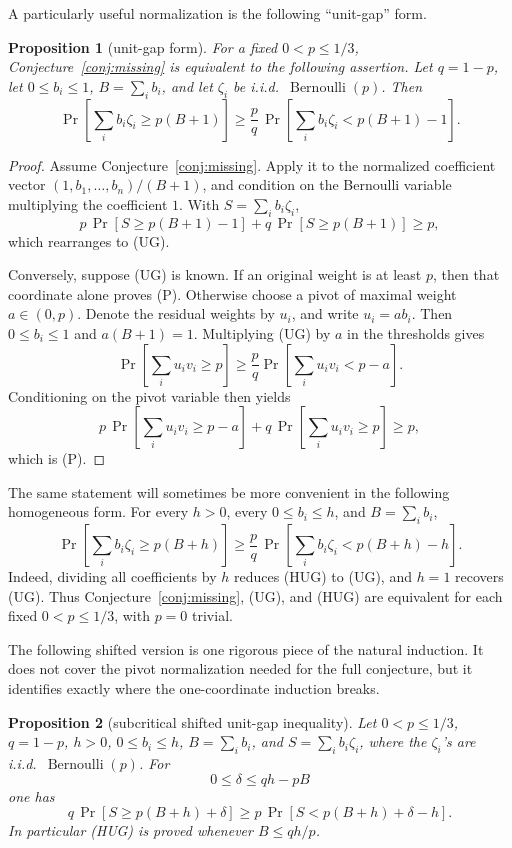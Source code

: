 \documentclass[12pt]{article}
\newtheorem{proposition}{Proposition}
\newcommand{\Ber}{\operatorname{Bernoulli}}
\begin{document}
A particularly useful normalization is the following ``unit-gap'' form.

\begin{proposition}[unit-gap form]\label{prop:unitgap}
For a fixed \(0<p\le1/3\), Conjecture~\ref{conj:missing} is equivalent to the
following assertion.  Let \(q=1-p\), let \(0\le b_i\le1\),
\(B=\sum_i b_i\), and let \(\zeta_i\) be i.i.d.\ \(\Ber(p)\).  Then
\[
 \Pr\!\left[\sum_i b_i\zeta_i\ge p(B+1)\right]
 \ge
 \frac{p}{q}\,
 \Pr\!\left[\sum_i b_i\zeta_i<p(B+1)-1\right].            \tag{UG}
\]
\end{proposition}

\begin{proof}
Assume Conjecture~\ref{conj:missing}.  Apply it to the normalized coefficient vector
\((1,b_1,\ldots,b_n)/(B+1)\), and condition on the
Bernoulli variable multiplying the coefficient \(1\).  With
\(S=\sum_i b_i\zeta_i\),
\[
 p\,\Pr[S\ge p(B+1)-1]+q\,\Pr[S\ge p(B+1)]\ge p,
\]
which rearranges to (UG).

Conversely, suppose (UG) is known.  If an original weight is at least \(p\),
then that coordinate alone proves (P).  Otherwise choose a pivot of maximal
weight \(a\in(0,p)\).  Denote the residual weights by \(u_i\), and write
\(u_i=a b_i\).  Then \(0\le b_i\le1\) and \(a(B+1)=1\).  Multiplying (UG) by \(a\) in the thresholds
gives
\[
 \Pr\!\left[\sum_i u_i v_i\ge p\right]
 \ge \frac pq
 \Pr\!\left[\sum_i u_i v_i<p-a\right].
\]
Conditioning on the pivot variable then yields
\[
 p\,\Pr\!\left[\sum_i u_i v_i\ge p-a\right]
 +q\,\Pr\!\left[\sum_i u_i v_i\ge p\right]\ge p,
\]
which is (P).
\end{proof}

The same statement will sometimes be more convenient in the following
homogeneous form.  For every \(h>0\), every \(0\le b_i\le h\), and
\(B=\sum_i b_i\),
\[
 \Pr\!\left[\sum_i b_i\zeta_i\ge p(B+h)\right]
 \ge
 \frac{p}{q}\,
 \Pr\!\left[\sum_i b_i\zeta_i<p(B+h)-h\right].            \tag{HUG}
\]
Indeed, dividing all coefficients by \(h\) reduces (HUG) to (UG), and \(h=1\)
recovers (UG).  Thus Conjecture~\ref{conj:missing}, (UG), and (HUG) are
equivalent for each fixed \(0<p\le1/3\), with \(p=0\) trivial.

The following shifted version is one rigorous piece of the natural induction.
It does not cover the pivot normalization needed for the full conjecture, but it
identifies exactly where the one-coordinate induction breaks.

\begin{proposition}[subcritical shifted unit-gap inequality]\label{prop:subcritical}
Let \(0<p\le1/3\), \(q=1-p\), \(h>0\), \(0\le b_i\le h\), \(B=\sum_i b_i\),
and \(S=\sum_i b_i\zeta_i\), where the \(\zeta_i\)'s are i.i.d.\ \(\Ber(p)\).
For
\[
        0\le \delta\le qh-pB
\]
one has
\[
 q\,\Pr\!\left[S\ge p(B+h)+\delta\right]
 \ge
 p\,\Pr\!\left[S<p(B+h)+\delta-h\right].                 \tag{6}
\]
In particular (HUG) is proved whenever \(B\le qh/p\).
\end{proposition}
\end{document}
